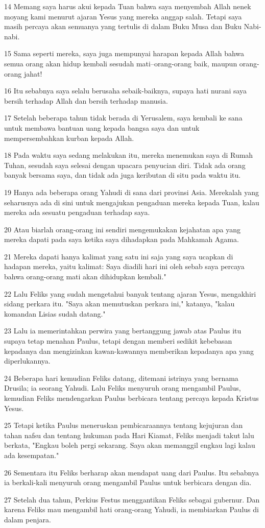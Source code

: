 \par 14 Memang saya harus akui kepada Tuan bahwa saya menyembah Allah nenek moyang kami menurut ajaran Yesus yang mereka anggap salah. Tetapi saya masih percaya akan semuanya yang tertulis di dalam Buku Musa dan Buku Nabi-nabi.
\par 15 Sama seperti mereka, saya juga mempunyai harapan kepada Allah bahwa semua orang akan hidup kembali sesudah mati--orang-orang baik, maupun orang-orang jahat!
\par 16 Itu sebabnya saya selalu berusaha sebaik-baiknya, supaya hati nurani saya bersih terhadap Allah dan bersih terhadap manusia.
\par 17 Setelah beberapa tahun tidak berada di Yerusalem, saya kembali ke sana untuk membawa bantuan uang kepada bangsa saya dan untuk mempersembahkan kurban kepada Allah.
\par 18 Pada waktu saya sedang melakukan itu, mereka menemukan saya di Rumah Tuhan, sesudah saya selesai dengan upacara penyucian diri. Tidak ada orang banyak bersama saya, dan tidak ada juga keributan di situ pada waktu itu.
\par 19 Hanya ada beberapa orang Yahudi di sana dari provinsi Asia. Merekalah yang seharusnya ada di sini untuk mengajukan pengaduan mereka kepada Tuan, kalau mereka ada sesuatu pengaduan terhadap saya.
\par 20 Atau biarlah orang-orang ini sendiri mengemukakan kejahatan apa yang mereka dapati pada saya ketika saya dihadapkan pada Mahkamah Agama.
\par 21 Mereka dapati hanya kalimat yang satu ini saja yang saya ucapkan di hadapan mereka, yaitu kalimat: Saya diadili hari ini oleh sebab saya percaya bahwa orang-orang mati akan dihidupkan kembali."
\par 22 Lalu Feliks yang sudah mengetahui banyak tentang ajaran Yesus, mengakhiri sidang perkara itu. "Saya akan memutuskan perkara ini," katanya, "kalau komandan Lisias sudah datang."
\par 23 Lalu ia memerintahkan perwira yang bertanggung jawab atas Paulus itu supaya tetap menahan Paulus, tetapi dengan memberi sedikit kebebasan kepadanya dan mengizinkan kawan-kawannya memberikan kepadanya apa yang diperlukannya.
\par 24 Beberapa hari kemudian Feliks datang, ditemani istrinya yang bernama Drusila; ia seorang Yahudi. Lalu Feliks menyuruh orang mengambil Paulus, kemudian Feliks mendengarkan Paulus berbicara tentang percaya kepada Kristus Yesus.
\par 25 Tetapi ketika Paulus meneruskan pembicaraannya tentang kejujuran dan tahan nafsu dan tentang hukuman pada Hari Kiamat, Feliks menjadi takut lalu berkata, "Engkau boleh pergi sekarang. Saya akan memanggil engkau lagi kalau ada kesempatan."
\par 26 Sementara itu Feliks berharap akan mendapat uang dari Paulus. Itu sebabnya ia berkali-kali menyuruh orang mengambil Paulus untuk berbicara dengan dia.
\par 27 Setelah dua tahun, Perkius Festus menggantikan Feliks sebagai gubernur. Dan karena Feliks mau mengambil hati orang-orang Yahudi, ia membiarkan Paulus di dalam penjara.

